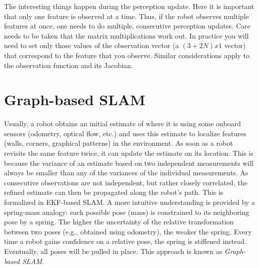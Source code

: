 \documentclass[paper=6.14in:9.21in,pagesize=pdftex,11pt,twoside,openright]{scrbook}
\begin{document}
The interesting things happen during the perception update. Here it is important that only one feature is observed at a time. Thus, if the robot observes multiple features at once, one needs to do multiple, consecutive perception updates. Care needs to be taken that the matrix multiplications work out. In practice you will need to set only those values of the observation vector (a $(3+2N)x1$ vector) that correspond to the feature that you observe. Similar considerations apply to the observation function and its Jacobian.

\section{Graph-based SLAM}
Usually, a robot obtains an initial estimate of where it is using some onboard sensors (odometry, optical flow, etc.) and uses this estimate to localize features (walls, corners, graphical patterns) in the environment. As soon as a robot revisits the same feature twice, it can update the estimate on its location. This is because the variance of an estimate based on two independent measurements will always be smaller than any of the variances of the individual measurements. As consecutive observations are not independent, but rather closely correlated, the refined estimate can then be propagated along the robot's path. This is formalized in EKF-based SLAM. A more intuitive understanding is provided by a spring-mass analogy: each possible pose (mass) is constrained to its neighboring pose by a spring. The higher the uncertainty of the relative transformation between two poses (e.g., obtained using odometry), the weaker the spring. Every time a robot gains confidence on a relative pose, the spring is stiffened instead. Eventually, all poses will be pulled in place. This approach is known as \emph{Graph-based SLAM}.
\end{document}
